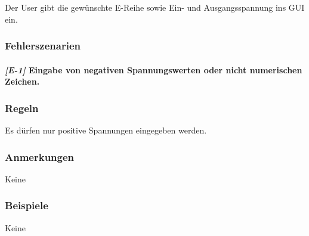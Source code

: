 %
%
Der User gibt die gewünschte E-Reihe sowie Ein- und Ausgangsspannung ins GUI ein.


\subsubsection{Fehlerszenarien}

\paragraph{\textit{\textbf{[E-1]}} Eingabe von negativen Spannungswerten oder nicht numerischen Zeichen.}

\subsubsection{Regeln}
Es dürfen nur positive Spannungen eingegeben werden.

\subsubsection{Anmerkungen}
Keine

\subsubsection{Beispiele}
Keine
\newpage

